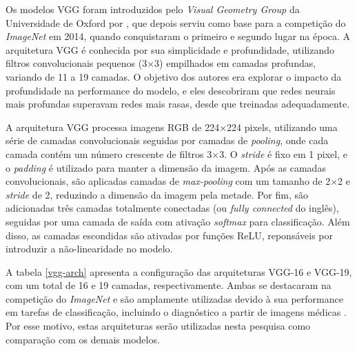 Os modelos VGG foram introduzidos pelo \textit{Visual Geometry Group} da Universidade de Oxford por \cite{Simonyan2015}, que depois serviu como base para a competição do \textit{ImageNet} em 2014, quando conquistaram o primeiro e segundo lugar na época. A arquitetura VGG é conhecida por sua simplicidade e profundidade, utilizando filtros convolucionais pequenos (3×3) empilhados em camadas profundas, variando de 11 a 19 camadas. O objetivo dos autores era explorar o impacto da profundidade na performance do modelo, e eles descobriram que redes neurais mais profundas superavam redes mais rasas, desde que treinadas adequadamente.

A arquitetura VGG processa imagens RGB de 224×224 pixels, utilizando uma série de camadas convolucionais seguidas por camadas de \textit{pooling}, onde cada camada contém um número crescente de filtros 3×3. O \textit{stride} é fixo em 1 pixel, e o \textit{padding} é utilizado para manter a dimensão da imagem. Após as camadas convolucionais, são aplicadas camadas de \textit{max-pooling} com um tamanho de 2×2 e \textit{stride} de 2, reduzindo a dimensão da imagem pela metade. Por fim, são adicionadas três camadas totalmente conectadas (ou \textit{fully connected} do inglês), seguidas por uma camada de saída com ativação \textit{softmax} para classificação. Além disso, as camadas escondidas são ativadas por funções ReLU, reponsáveis por introduzir a não-linearidade no modelo.

A tabela \ref{vgg-arch} apresenta a configuração das arquiteturas VGG-16 e VGG-19, com um total de 16 e 19 camadas, respectivamente. Ambas se destacaram na competição do \textit{ImageNet} e são amplamente utilizadas devido à sua performance em tarefas de classificação, incluindo o diagnóstico a partir de imagens médicas \citep{Saini2023, Sitaula2021}. Por esse motivo, estas arquiteturas serão utilizadas nesta pesquisa como comparação com os demais modelos.

